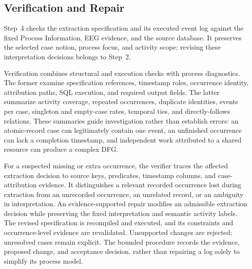 \subsection{Verification and Repair}
\label{sec:verification-repair}
Step~4 checks the extraction specification and its executed event log against the fixed Process Information, EEG evidence, and the source database. It preserves the selected case notion, process focus, and activity scope; revising these interpretation decisions belongs to Step~2.

Verification combines structural and execution checks with process diagnostics. The former examine specification references, timestamp roles, occurrence identity, attribution paths, SQL execution, and required output fields. The latter summarize activity coverage, repeated occurrences, duplicate identities, events per case, singleton and empty-case rates, temporal ties, and directly-follows relations. These summaries guide investigation rather than establish errors: an atomic-record case can legitimately contain one event, an unfinished occurrence can lack a completion timestamp, and independent work attributed to a shared resource can produce a complex DFG.

For a suspected missing or extra occurrence, the verifier traces the affected extraction decision to source keys, predicates, timestamp columns, and case-attribution evidence. It distinguishes a relevant recorded occurrence lost during extraction from an unrecorded occurrence, an unrelated record, or an ambiguity in interpretation. An evidence-supported repair modifies an admissible extraction decision while preserving the fixed interpretation and semantic activity labels. The revised specification is recompiled and executed, and its constraints and occurrence-level evidence are revalidated. Unsupported changes are rejected; unresolved cases remain explicit. The bounded procedure records the evidence, proposed change, and acceptance decision, rather than repairing a log solely to simplify its process model.
